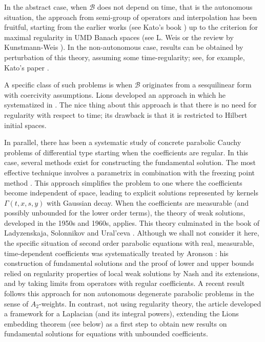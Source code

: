 \documentclass[11pt, letterpaper]{amsart}
\theoremstyle{definition}
\theoremstyle{remark}
\numberwithin{equation}{section}
\begin{document}
In the abstract case, when $\mathcal{B}$ does not depend on time, that is the autonomous situation, the approach from semi-group of operators and interpolation has been fruitful, starting from the earlier works (see Kato's book \cite{kato2013perturbation}) up to the criterion for maximal regularity in UMD Banach spaces  (see L. Weis \cite{weis2001operator} or the review by Kunstmann-Weis \cite{kunstmann2004maximal}).  In the non-autonomous case, results can be obtained by perturbation of this theory, assuming some time-regularity; see, for example, Kato's paper \cite{kato1961abstract}. 

 

A specific class of such problems is when $\mathcal{B}$  originates from a sesquilinear form with coercivity assumptions. Lions developed an  approach in \cite{lions1957problemes} which he  systematized in \cite{lions2013equations}. The nice thing about this approach is that there is no need for regularity with respect to time; its drawback is that it is restricted to  Hilbert initial spaces. 

In parallel, there has been a systematic study of    
concrete parabolic Cauchy problems of differential type starting  when the coefficients are regular. In this case, several methods exist for constructing the fundamental solution. The most effective technique involves a parametrix in combination with the freezing point method \cite{friedman2008partial}. This approach simplifies the problem to one where the coefficients become independent of space, leading to explicit solutions represented by kernels $ \Gamma(t, x, s, y) $ with Gaussian decay. When the coefficients are measurable (and possibly unbounded for the lower order terms), the theory of weak solutions, developed in the 1950s and 1960s, applies. This theory culminated in the book of Ladyzenskaja, Solonnikov and Ural'ceva \cite{ladyzhenskaia1968linear}. Although we shall not consider it here, the specific situation of second order parabolic equations with real, measurable, time-dependent coefficients was systematically treated by Aronson \cite{ aronson1967bounds, aronson1968non}: his construction of fundamental solutions and the proof of  lower and upper bounds relied on regularity properties of local weak solutions by Nash \cite{nash1958continuity} and its extensions, and by taking limits from operators with regular coefficients.  A recent result \cite{ataei2024fundamental} follows this approach for non autonomous degenerate parabolic problems in the sense of $A_{2}$-weights. In contrast, not using regularity theory, the article \cite{auscher2023universal} developed a framework for a Laplacian (and its integral powers), extending the Lions embedding theorem (see below) as a first step to obtain new results on fundamental solutions for equations with unbounded coefficients.
\end{document}
